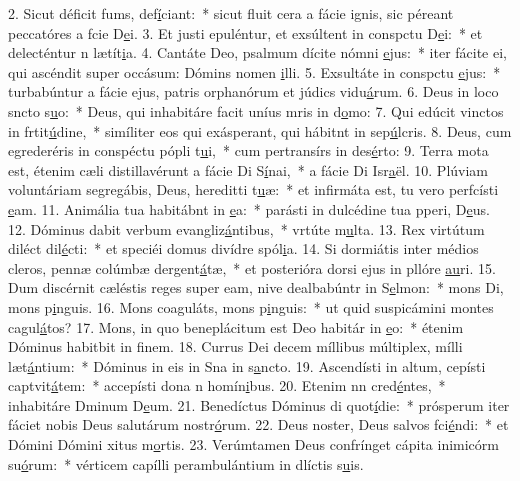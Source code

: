 2. Sicut déficit fums, def\uline{í}ciant:~* sicut fluit cera a fácie ignis, sic péreant peccatóres a fcie D\uline{e}i.
3. Et justi epuléntur, et exsúltent in conspctu D\uline{e}i:~* et delecténtur n lætít\uline{i}a.
4. Cantáte Deo, psalmum dícite nómni \uline{e}jus:~* iter fácite ei, qui ascéndit super occásum: Dómins nomen \uline{i}lli.
5. Exsultáte in conspctu \uline{e}jus:~* turbabúntur a fácie ejus, patris orphanórum et júdics vidu\uline{á}rum.
6. Deus in loco sncto s\uline{u}o:~* Deus, qui inhabitáre facit uníus mris in d\uline{o}mo:
7. Qui edúcit vinctos in frtit\uline{ú}dine,~* simíliter eos qui exásperant, qui hábitnt in sep\uline{ú}lcris.
8. Deus, cum egrederéris in conspéctu pópli t\uline{u}i,~* cum pertransírs in des\uline{é}rto:
9. Terra mota est, étenim cæli distillavérunt a fácie Di S\uline{í}nai,~* a fácie Di Isr\uline{a}ël.
10. Plúviam voluntáriam segregábis, Deus, hereditti t\uline{u}æ:~* et infirmáta est, tu vero perfcísti \uline{e}am.
11. Animália tua habitábnt in \uline{e}a:~* parásti in dulcédine tua pperi, D\uline{e}us.
12. Dóminus dabit verbum evangliz\uline{á}ntibus,~* vrtúte m\uline{u}lta.
13. Rex virtútum diléct dil\uline{é}cti:~* et speciéi domus divídre spól\uline{i}a.
14. Si dormiátis inter médios cleros, pennæ colúmbæ dergent\uline{á}tæ,~* et posterióra dorsi ejus in pllóre \uline{au}ri.
15. Dum discérnit cæléstis reges super eam, nive dealbabúntr in S\uline{e}lmon:~* mons Di, mons p\uline{i}nguis.
16. Mons coaguláts, mons p\uline{i}nguis:~* ut quid suspicámini montes cagul\uline{á}tos?
17. Mons, in quo beneplácitum est Deo habitár in \uline{e}o:~* étenim Dóminus habitbit in f\uline{i}nem.
18. Currus Dei decem míllibus múltiplex, mílli læt\uline{á}ntium:~* Dóminus in eis in Sna in s\uline{a}ncto.
19. Ascendísti in altum, cepísti captvit\uline{á}tem:~* accepísti dona n homín\uline{i}bus.
20. Etenim nn cred\uline{é}ntes,~* inhabitáre Dminum D\uline{e}um.
21. Benedíctus Dóminus di quot\uline{í}die:~* prósperum iter fáciet nobis Deus salutárum nostr\uline{ó}rum.
22. Deus noster, Deus salvos fci\uline{é}ndi:~* et Dómini Dómini xitus m\uline{o}rtis.
23. Verúmtamen Deus confrínget cápita inimicórm su\uline{ó}rum:~* vérticem capílli perambulántium in dlíctis s\uline{u}is.
